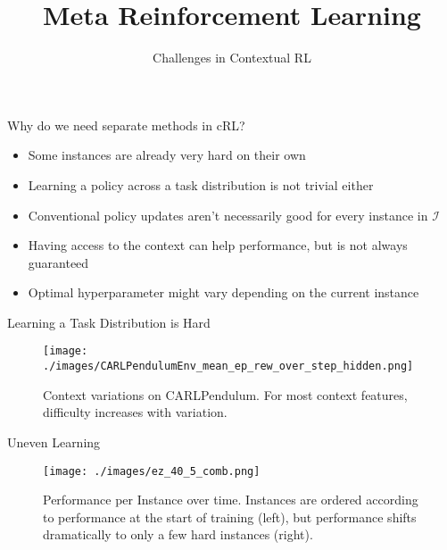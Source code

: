 \documentclass[aspectratio=169]{../latex_main/tntbeamer}  %
\title[Meta-RL]{Meta Reinforcement Learning}
\subtitle{Challenges in Contextual RL}
\begin{document}
	
	\maketitle

\begin{frame}[c]{Why do we need separate methods in cRL?}

\begin{itemize}
	\item Some instances are already very hard on their own
	\item Learning a policy across a task distribution is not trivial either
	\item Conventional policy updates aren't necessarily good for every instance in $\mathcal{I}$
	\item Having access to the context can help performance, but is not always guaranteed
	\item Optimal hyperparameter might vary depending on the current instance
\end{itemize}


\end{frame}
\begin{frame}[c]{Learning a Task Distribution is Hard}
	
\begin{figure}
    \centering
    \texttt{[image: ./images/CARLPendulumEnv\_mean\_ep\_rew\_over\_step\_hidden.png]}
    \caption{Context variations on CARLPendulum. For most context features, difficulty increases with variation.}
    \label{fig:my_label}
\end{figure}
	
\end{frame}
\begin{frame}[c]{Uneven Learning}
	
\begin{figure}
    \centering
    \texttt{[image: ./images/ez\_40\_5\_comb.png]}
    \caption{Performance per Instance over time. Instances are ordered according to performance at the start of training (left), but performance shifts dramatically to only a few hard instances (right).}
    \label{fig:my_label}
\end{figure}
	
\end{frame}
\end{document}

